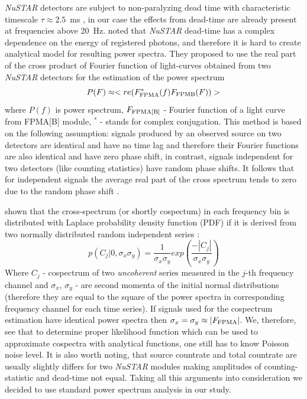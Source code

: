 \documentclass[a4paper,fleqn,usenatbib]{mnras}
\begin{document}
{\it NuSTAR} detectors are subject to non-paralyzing dead time with characteristic timescale $\tau \approx 2.5$~ms \citep{2015ApJ...800..109B}, in our case the effects from dead-time are already present at frequencies above 20~Hz.
\citet{2015ApJ...800..109B} noted that {\it NuSTAR} dead-time has a complex dependence on the energy of registered photons, and therefore it is hard to create analytical model for resulting power spectra. 
They proposed to use the real part of the cross product of Fourier function of light-curves obtained from two {\it NuSTAR} detectors for the estimation of the power spectrum 
\begin{equation}
        P(F) \approx <re(F_{\rm FPMA}^{*}(f)F_{\rm FPMB}(F))>
\end{equation}
where $P(f)$ is power spectrum, $F_{\rm FPMA[B]}$ - Fourier function of a light curve from FPMA[B] module, $^{*}$ - stands for complex conjugation. 
This method is based on the following assumption: signals produced by an observed source on two detectors are identical and have no time lag and therefore their Fourier functions are also identical and have zero phase shift, in contrast, signals independent for two detectors (like counting statistics) have random phase shifts.  
It follows that for independent signals the average real part of the cross spectrum tends to zero due to the random phase shift .

\citet{2017arXiv170909666H} shown that the cross-spectrum (or shortly cospectum) in each frequency bin is distributed with Laplace probability density function (PDF) if it is derived from two normally distributed random independent series \citep[see, e.q. 14 in ][]{2017arXiv170909666H}:
\begin{equation}
        p(C_{j}|0, \sigma_x \sigma_y) = \frac{1}{\sigma_x \sigma_y} exp{\left(\frac{-|C_{j}|}{\sigma_x \sigma_y} \right)}
\end{equation}
Where $C_{j}$ - cospectrum of two {\it uncoherent} series measured in the $j$-th frequency channel and $\sigma_x$, $\sigma_y$ - are second momenta of the initial normal distributions (therefore they are equal to the square of the power spectra in corresponding frequency channel for each time series).
If signals used for the cospectrum estimation have identical power spectra then $\sigma_x = \sigma_y \approx |F_{\rm FPMA}|$.
We, therefore, see that to determine proper likelihood function which can be used to approximate cospectra with analytical functions, one still has to know Poisson noise level.
It is also worth noting, that source countrate and total countrate are usually slightly differs for two {\it NuSTAR} modules making amplitudes of counting-statistic and dead-time not equal.
Taking all this arguments into consideration we decided to use standard power spectrum analysis in our study.
\end{document}
